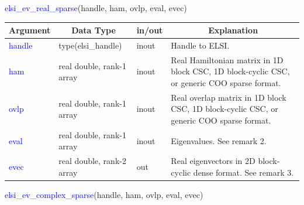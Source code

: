 \documentclass{report}
\begin{document}
\begin{labeling}{\hspace{6cm}}
\item [\hspace{0.3cm} \textcolor{blue}{elsi\_ev\_real\_sparse}(handle, ham, ovlp, eval, evec)]
\end{labeling}

\begin{table}[h]
\centering
\begin{tabular}[]{|p{20mm}|p{45mm}|p{15mm}|p{85mm}|}
\hline
\multicolumn{1}{|c|}{\textbf{Argument}} & \multicolumn{1}{c|}{\textbf{Data Type}} & \multicolumn{1}{c|}{\textbf{in/out}} & \multicolumn{1}{c|}{\textbf{Explanation}}\\
\hline
\textcolor{blue}{handle} & type(elsi\_handle)        & inout & Handle to ELSI.\\
\hline
\textcolor{blue}{ham}    & real double, rank-1 array & inout & Real Hamiltonian matrix in 1D block CSC, 1D block-cyclic CSC, or generic COO sparse format.\\
\hline
\textcolor{blue}{ovlp}   & real double, rank-1 array & inout & Real overlap matrix in 1D block CSC, 1D block-cyclic CSC, or generic COO sparse format.\\
\hline
\textcolor{blue}{eval}   & real double, rank-1 array & inout & Eigenvalues.  See remark 2.\\
\hline
\textcolor{blue}{evec}   & real double, rank-2 array & out   & Real eigenvectors in 2D block-cyclic dense format.  See remark 3.\\
\hline
\end{tabular}
\end{table}

\begin{labeling}{\hspace{6cm}}
\item [\hspace{0.3cm} \textcolor{blue}{elsi\_ev\_complex\_sparse}(handle, ham, ovlp, eval, evec)]
\end{labeling}
\end{document}
